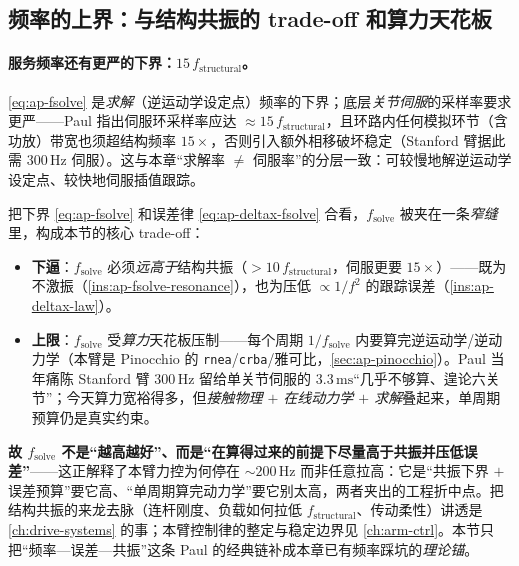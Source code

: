 \subsection{频率的上界：与结构共振的 trade-off 和算力天花板}
\label{sec:ap-fsolve-tradeoff}

\paragraph{服务频率还有更严的下界：$15\,f_{\mathrm{structural}}$。}
\cref{eq:ap-fsolve} 是\emph{求解}（逆运动学设定点）频率的下界；底层\emph{关节伺服}的采样率要求更严——Paul 指出伺服环采样率应达 $\approx15\,f_{\mathrm{structural}}$，且环路内任何模拟环节（含功放）带宽也须超结构频率 $15\times$，否则引入额外相移破坏稳定\cite{paul1981robot}（Stanford 臂据此需 $300\,\mathrm{Hz}$ 伺服）。这与本章“求解率 $\ne$ 伺服率”的分层一致：可较慢地解逆运动学设定点、较快地伺服插值跟踪。

\begin{insight}\label{ins:ap-fsolve-tradeoff}
把下界 \cref{eq:ap-fsolve} 和误差律 \cref{eq:ap-deltax-fsolve} 合看，$f_{\mathrm{solve}}$ 被夹在一条\emph{窄缝}里，构成本节的核心 trade-off：
\begin{itemize}
  \item \textbf{下逼}：$f_{\mathrm{solve}}$ 必须\emph{远高于}结构共振（$>10\,f_{\mathrm{structural}}$，伺服更要 $15\times$）——既为不激振（\cref{ins:ap-fsolve-resonance}），也为压低 $\propto1/f^2$ 的跟踪误差（\cref{ins:ap-deltax-law}）。
  \item \textbf{上限}：$f_{\mathrm{solve}}$ 受\emph{算力}天花板压制——每个周期 $1/f_{\mathrm{solve}}$ 内要算完逆运动学/逆动力学（本臂是 Pinocchio 的 \texttt{rnea}/\allowbreak\texttt{crba}/雅可比，\cref{sec:ap-pinocchio}）。Paul 当年痛陈 Stanford 臂 $300\,\mathrm{Hz}$ 留给单关节伺服的 $3.3\,\mathrm{ms}$“几乎不够算、遑论六关节”；今天算力宽裕得多，但\emph{接触物理 $+$ 在线动力学 $+$ 求解}叠起来，单周期预算仍是真实约束。
\end{itemize}
\textbf{故 $f_{\mathrm{solve}}$ 不是“越高越好”、而是“在算得过来的前提下尽量高于共振并压低误差”}——这正解释了本臂力控为何停在 $\sim200\,\mathrm{Hz}$ 而非任意拉高：它是“共振下界 $+$ 误差预算”要它高、“单周期算完动力学”要它别太高，两者夹出的工程折中点。把结构共振的来龙去脉（连杆刚度、负载如何拉低 $f_{\mathrm{structural}}$、传动柔性）讲透是\cref{ch:drive-systems} 的事；本臂控制律的整定与稳定边界见 \cref{ch:arm-ctrl}。本节只把“频率—误差—共振”这条 Paul 的经典链补成本章已有频率踩坑的\emph{理论锚}。
\end{insight}

